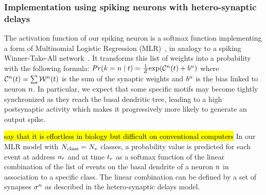 \documentclass[default]{sn-jnl}%
\theoremstyle{thmstyleone}%
\theoremstyle{thmstyletwo}%
\theoremstyle{thmstylethree}%
\newcommand{\note}[1]{{\sethlcolor{yellow}\hl{#1}}}
\begin{document}
\subsubsection{Implementation using spiking neurons with hetero-synaptic delays}
%
The activation function of our spiking neuron is a softmax function implementing a form of  Multinomial Logistic Regression (MLR)~\citep{grimaldi_robust_2022}, in analogy to a spiking Winner-Take-All network~\citep{nessler_bayesian_2013}. 
It transforms this list of weights into a probability with the following formula:
$
Pr(k=n \; \vert \; t) =
\frac 1 Z
{\exp  (\mathcal{C}^n(t) +b^n) }
$ 
where $\mathcal{C}^n(t) = \sum
\mathcal{W}^n(t)
$ is the sum of the synaptic weights and $b^n$ is the bias linked to neuron $n$. 
In particular, we expect that some specific motifs may become tightly synchronized as they reach the basal dendritic tree, leading to a high postsynaptic activity which makes it progressively more likely to generate an output spike.
%

\note{say that it is effortless in biology but difficult on conventional computers}
In our MLR model with $N_\text{class}=N_v$ classes, a probability value is predicted for each event at address $a_r$ and at time $t_r$ as a softmax function of the linear combination of the list of events on the basal dendrite of a neuron $n$ in association to a specific class. The linear combination can be defined by a set of synapses $\sigma^n$ as described in the hetero-synaptic delays model. 
%
\end{document}
